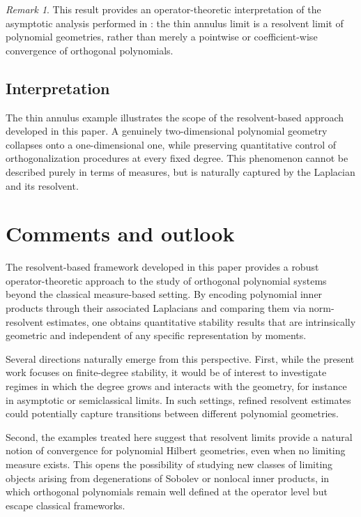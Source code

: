 \documentclass{amsart}
\numberwithin{equation}{section}
\theoremstyle{definition}
\theoremstyle{remark}
\newtheorem{remark}[theorem]{Remark}
\begin{document}
\begin{remark}
This result provides an operator-theoretic interpretation of the asymptotic analysis
performed in \cite{MagnotThinAnnuli}:
the thin annulus limit is a resolvent limit of polynomial geometries, rather than merely
a pointwise or coefficient-wise convergence of orthogonal polynomials.
\end{remark}

\subsection{Interpretation}

The thin annulus example illustrates the scope of the resolvent-based approach developed
in this paper.
A genuinely two-dimensional polynomial geometry collapses onto a one-dimensional one,
while preserving quantitative control of orthogonalization procedures at every fixed degree.
This phenomenon cannot be described purely in terms of measures, but is naturally captured
by the Laplacian and its resolvent.
\section*{Comments and outlook}

The resolvent-based framework developed in this paper provides a robust operator-theoretic
approach to the study of orthogonal polynomial systems beyond the classical measure-based
setting.
By encoding polynomial inner products through their associated Laplacians and comparing
them via norm-resolvent estimates, one obtains quantitative stability results that are
intrinsically geometric and independent of any specific representation by moments.

Several directions naturally emerge from this perspective.
First, while the present work focuses on finite-degree stability, it would be of interest
to investigate regimes in which the degree grows and interacts with the geometry, for
instance in asymptotic or semiclassical limits.
In such settings, refined resolvent estimates could potentially capture transitions between
different polynomial geometries.

Second, the examples treated here suggest that resolvent limits provide a natural notion of
convergence for polynomial Hilbert geometries, even when no limiting measure exists.
This opens the possibility of studying new classes of limiting objects arising from
degenerations of Sobolev or nonlocal inner products, in which orthogonal polynomials remain
well defined at the operator level but escape classical frameworks.
\end{document}
